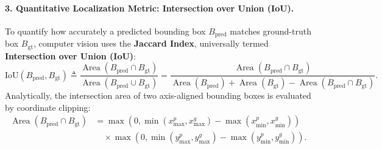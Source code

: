 \paragraph{3. Quantitative Localization Metric: Intersection over Union (IoU).}
To quantify how accurately a predicted bounding box $B_{\text{pred}}$ matches ground-truth box $B_{\text{gt}}$, computer vision uses the \textbf{Jaccard Index}, universally termed \textbf{Intersection over Union (IoU)}:
\begin{equation}
\text{IoU}(B_{\text{pred}}, B_{\text{gt}}) \triangleq \frac{\operatorname{Area}(B_{\text{pred}} \cap B_{\text{gt}})}{\operatorname{Area}(B_{\text{pred}} \cup B_{\text{gt}})} = \frac{\operatorname{Area}(B_{\text{pred}} \cap B_{\text{gt}})}{\operatorname{Area}(B_{\text{pred}}) + \operatorname{Area}(B_{\text{gt}}) - \operatorname{Area}(B_{\text{pred}} \cap B_{\text{gt}})}.
\label{eq:iou_definition}
\end{equation}
Analytically, the intersection area of two axis-aligned bounding boxes is evaluated by coordinate clipping:
\begin{align}
\operatorname{Area}(B_{\text{pred}} \cap B_{\text{gt}}) &= \max\left(0, \min(x_{\max}^p, x_{\max}^g) - \max(x_{\min}^p, x_{\min}^g)\right) \nonumber \\
&\quad \times \max\left(0, \min(y_{\max}^p, y_{\max}^g) - \max(y_{\min}^p, y_{\min}^g)\right).
\label{eq:iou_overlap_area}
\end{align}


